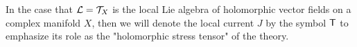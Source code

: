 \documentclass[11pt]{amsart}
\renewcommand{\op}{\operatorname}
\begin{document}
In the case that $\mathcal L = \mathcal T_X$ is the local Lie algebra of holomorphic vector fields on a complex manifold $X$, then we
will denote the local current $J$ by the symbol $\mathsf T$ to emphasize its role as the "holomorphic stress tensor" of the
theory.



%
\end{document}
